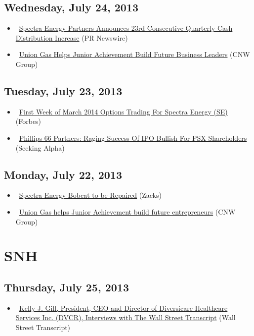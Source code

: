 \documentclass[11pt,asymmetric]{article}
\begin{document}
\subsection*{Wednesday, July 24, 2013}
\begin{itemize}
\item\ \href{http://finance.yahoo.com/news/spectra-energy-partners-announces-23rd-200500853.html}{Spectra Energy Partners Announces 23rd Consecutive Quarterly Cash Distribution Increase} (PR Newswire)
\item\ \href{http://finance.yahoo.com/news/union-gas-helps-junior-achievement-150000885.html}{Union Gas Helps Junior Achievement Build Future Business Leaders} (CNW Group)
\end{itemize}
\subsection*{Tuesday, July 23, 2013}
\begin{itemize}
\item\ \href{http://www.forbes.com/sites/stockoptionschannel/2013/07/23/first-week-of-march-2014-options-trading-for-spectra-energy-se/?partner=yahootix}{First Week of March 2014 Options Trading For Spectra Energy (SE)} (Forbes)
\item\ \href{http://seekingalpha.com/article/1563922-phillips-66-partners-raging-success-of-ipo-bullish-for-psx-shareholders?source=yahoo}{Phillips 66 Partners: Raging Success Of IPO Bullish For PSX Shareholders} (Seeking Alpha)
\end{itemize}
\subsection*{Monday, July 22, 2013}
\begin{itemize}
\item\ \href{http://finance.yahoo.com/news/spectra-energy-bobcat-repaired-184002043.html}{Spectra Energy Bobcat to be Repaired} (Zacks)
\item\ \href{http://finance.yahoo.com/news/union-gas-helps-junior-achievement-150000975.html}{Union Gas helps Junior Achievement build future entrepreneurs} (CNW Group)
\end{itemize}

\section*{SNH}

\subsection*{Thursday, July 25, 2013}
\begin{itemize}
\item\ \href{http://finance.yahoo.com/news/kelly-j-gill-president-ceo-202900211.html}{Kelly J. Gill, President, CEO and Director of Diversicare Healthcare Services Inc. (DVCR), Interviews with The Wall Street Transcript} (Wall Street Transcript)
\end{itemize}
\end{document}

